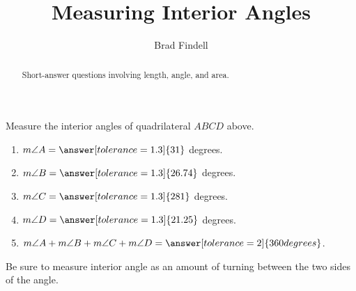 \documentclass[nooutcomes]{ximera}
\title{Measuring Interior Angles}
\author{Brad Findell}
\begin{document}
\begin{abstract}
Short-answer questions involving length, angle, and area. 
\end{abstract}
\maketitle

\begin{center}  
\end{center}
\begin{problem}
Measure the interior angles of quadrilateral $ABCD$ above.  
\begin{enumerate}
\item $m\angle A = \answer[tolerance=1.3]{31}$ degrees.
\item $m\angle B = \answer[tolerance=1.3]{26.74}$ degrees.
\item $m\angle C = \answer[tolerance=1.3]{281}$ degrees.
\item $m\angle D = \answer[tolerance=1.3]{21.25}$ degrees.
\item $m\angle A + m\angle B + m\angle C + m\angle D = \answer[tolerance=2]{360 degrees}$.
\end{enumerate}
\begin{hint}
Be sure to measure interior angle as an amount of turning between the two sides of the angle.   
\end{hint}

\end{problem}
\end{document}
